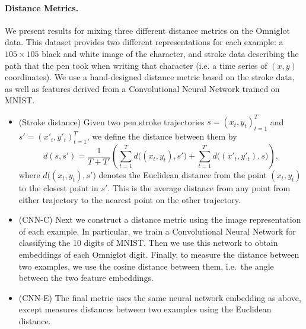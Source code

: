 \paragraph{Distance Metrics.} We present results for mixing three different distance metrics on the Omniglot data. This dataset provides two different representations for each example: a $105 \times 105$ black and white image of the character, and stroke data describing the path that the pen took when writing that character (i.e. a time series of $(x,y)$ coordinates). We use a hand-designed distance metric based on the stroke data, as well as features derived from a Convolutional Neural Network trained on MNIST.
%
\begin{itemize}
  \item (Stroke distance) Given two pen stroke trajectories $s = (x_t,
  y_t)_{t=1}^T$ and $s' = (x'_t, y'_t)_{t=1}^T$, we define the distance between
  them by
  \[
    d(s,s') = \frac{1}{T + T'} \left(
      \sum_{t=1}^T d\bigl((x_t, y_t), s'\bigr)
      +
      \sum_{t=1}^{T'} d\bigl((x'_t, y'_t), s\bigr)
    \right),
  \]
  where $d\bigl((x_t, y_t), s'\bigr)$ denotes the Euclidean distance from the
  point $(x_t, y_t)$ to the closest point in $s'$. This is the average distance
  from any point from either trajectory to the nearest point on the other
  trajectory.
  \item (CNN-C) Next we construct a distance metric using the image
  representation of each example. In particular, we train a Convolutional Neural
  Network for classifying the 10 digits of MNIST. Then we use this network to
  obtain embeddings of each Omniglot digit. Finally, to measure the distance
  between two examples, we use the cosine distance between them, i.e.\ the
  angle between the two feature embeddings.
  \item (CNN-E) The final metric uses the same neural network embedding as
  above, except measures distances between two examples using the Euclidean
  distance.
\end{itemize}


